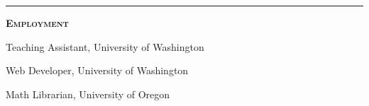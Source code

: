 \documentclass[12pt]{article}
\newcommand{\sectionheading}[1]
{
\bigskip %
\noindent
\hspace{-6.5mm}\textcolor{Gray}{\rule[.75mm]{21.5mm}{1mm}} %
\hspace{.2mm}	%
{\large{\textbf{\textsc{#1}}}} %
}
\newenvironment{date_section}
	{
	\vspace{-1ex}
	\leftmargini = 15ex
		\begin{itemize}[
			labelsep = *,
			labelwidth = 9ex,
			labelindent = 0ex,
			itemindent = !,
			font=\normalfont,
			align=parleft
		]{}
		\itemsep=-1.5mm
	}
	{\end{itemize}\vspace{-2ex}}
\newcommand{\yearmo}[2]{
	\item[
		{\makebox[1ex][r]{#1}}
		\hspace{1ex}
		{\makebox[1ex][l]{#2} }
		] }
\newcommand{\yearrange}[2]{
	\item[
		{\makebox[1ex][r]{#1}}
		--
		{\makebox[1ex][l]{#2} }
		] }
\begin{document}
	\sectionheading{Employment}%
	
	\begin{date_section}
		
		\yearrange{2013}{2018} Teaching Assistant,  University of Washington
		
		\yearrange{2015}{2017} Web Developer, University of Washington
		
		
		
		\yearrange{2012}{2013} Math Librarian, University of Oregon
		
		
		
		
		
		
	\end{date_section}

%
%
%
%
\end{document}
